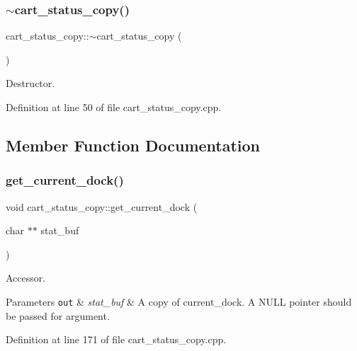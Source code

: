 \subsubsection{\texorpdfstring{$\sim$cart\+\_\+status\+\_\+copy()}{~cart\_status\_copy()}}
{\footnotesize\ttfamily cart\+\_\+status\+\_\+copy\+::$\sim$cart\+\_\+status\+\_\+copy (\begin{DoxyParamCaption}{ }\end{DoxyParamCaption})}

Destructor. 

Definition at line 50 of file cart\+\_\+status\+\_\+copy.\+cpp.



\subsection{Member Function Documentation}
\mbox{\label{classcart__status__copy_abcd7994b919a1a5191df8d29fceacbb3}} 
\subsubsection{\texorpdfstring{get\+\_\+current\+\_\+dock()}{get\_current\_dock()}}
{\footnotesize\ttfamily void cart\+\_\+status\+\_\+copy\+::get\+\_\+current\+\_\+dock (\begin{DoxyParamCaption}\item[{char $\ast$$\ast$}]{stat\+\_\+buf }\end{DoxyParamCaption})}

Accessor. 
\begin{DoxyParams}[1]{Parameters}
\mbox{\tt out}  & {\em stat\+\_\+buf} & A copy of current\+\_\+dock. A N\+U\+LL pointer should be passed for argument. \\
\hline
\end{DoxyParams}


Definition at line 171 of file cart\+\_\+status\+\_\+copy.\+cpp.

\mbox{\label{classcart__status__copy_a30bf6eef16e96b282b4e79ca9ccb36dd}} 
